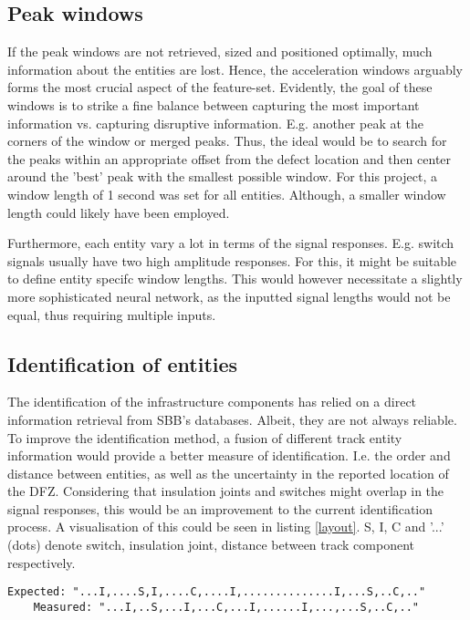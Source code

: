 \subsection{Peak windows}
If the peak windows are not retrieved, sized and positioned optimally, much information about the entities are lost. Hence, the acceleration windows arguably forms the most crucial aspect of the feature-set. Evidently, the goal of these windows is to strike a fine balance between capturing the most important information vs. capturing disruptive information. E.g. another peak at the corners of the window or merged peaks. Thus, the ideal would be to search for the peaks within an appropriate offset from the defect location and then center around the 'best' peak with the smallest possible window. For this project, a window length of 1 second was set for all entities. Although, a smaller window length could likely have been employed.

Furthermore, each entity vary a lot in terms of the signal responses. E.g. switch signals usually have two high amplitude responses. For this, it might be suitable to define entity specifc window lengths. This would however necessitate a slightly more sophisticated neural network, as the inputted signal lengths would not be equal, thus requiring multiple inputs. 

\subsection{Identification of entities}
The identification of the infrastructure components has relied on a direct information retrieval from SBB's databases. Albeit, they are not always reliable. To improve the identification method, a fusion of different track entity information would provide a better measure of identification. I.e. the order and distance between entities, as well as the uncertainty in the reported location of the DFZ. Considering that insulation joints and switches might overlap in the signal responses, this would be an improvement to the current identification process. A visualisation of this could be seen in listing \ref{layout}. S, I, C and '...' (dots) denote switch, insulation joint, distance between track component respectively.

\begin{lstlisting}[frame=single, caption=Expected layout of entities vs actual layout., label=layout]
    Expected: "...I,....S,I,....C,....I,..............I,...S,..C,.."
    Measured: "...I,..S,...I,...C,...I,......I,...,...S,..C,.."
\end{lstlisting}

